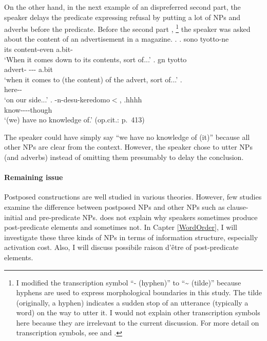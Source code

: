 On the other hand, in the next example of an dispreferred second part,
the speaker delays the predicate expressing refusal
by putting a lot of NPs and adverbs before the predicate.
Before the second part \Next,%
 \footnote{
 I modified the transcription symbol ``- (hyphen)'' to ``{\textasciitilde} (tilde)'' because hyphens are used to express morphological boundaries in this study.
 The tilde (originally, a hyphen) indicates a sudden stop of an utterance (typically a word) on the way to utter it.
 I would not explain other transcription symbols here because
 they are irrelevant to the current discussion.
 For more detail on transcription symbols,
 see  and .
 }
the speaker was asked about the content of an advertisement in a magazine.
%
\ex.
 \ag. sono  tyotto-ne \\
      its \hspace{0.2cm}content-even a.bit- \\
      `When it comes down to its contents, sort of...'
 \bg.  gn  tyotto \\
      advert-  --- a.bit \\
      `when it comes to (the content) of the advert, sort of...'
 \bg.  \\
      here-- \\
      `on our side...'
 \bg. -n-desu-keredomo$<$, .hhhh \\
      know----though \\
      `(we) have no knowledge of.'
      \hfill{(op.cit.: p.~413)}

The speaker could have simply say ``we have no knowledge of (it)''
because all other NPs are clear from the context.
However, the speaker chose to utter NPs (and adverbs) instead of omitting them presumably to delay the conclusion.

\paragraph{Remaining issue}

Postposed constructions are well studied in various theories.
However, few studies examine the difference between postposed NPs and
other NPs such as clause-initial and pre-predicate NPs.
 does not explain why speakers sometimes produce
post-predicate elements and sometimes not.
In Capter \ref{WordOrder},
I will investigate these three kinds of NPs in terms of information structure,
especially activation cost.
Also, I will discuss possibile raison d'{\^{e}}tre of post-predicate elements.

